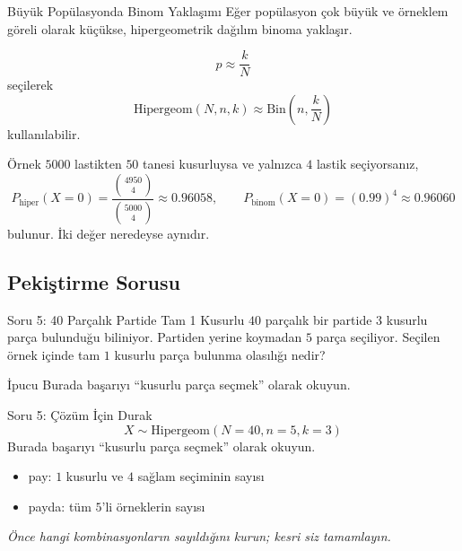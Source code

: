 \documentclass[light]{lutbeamer}
\begin{document}
\begin{frame}{Büyük Popülasyonda Binom Yaklaşımı}
    \scriptsize
    Eğer popülasyon çok büyük ve örneklem göreli olarak küçükse, hipergeometrik dağılım binoma yaklaşır.

    \[
    p \approx \frac{k}{N}
    \]
    seçilerek
    \[
    \text{Hipergeom}(N,n,k) \approx \mathrm{Bin}\left(n,\frac{k}{N}\right)
    \]
    kullanılabilir.

    \begin{exampleblock}{Örnek}
        \(5000\) lastikten \(50\) tanesi kusurluysa ve yalnızca \(4\) lastik seçiyorsanız,
        \[
        P_{\text{hiper}}(X=0)=\frac{\binom{4950}{4}}{\binom{5000}{4}}\approx 0.96058,\qquad
        P_{\text{binom}}(X=0)=(0.99)^4\approx 0.96060
        \]
        bulunur. İki değer neredeyse aynıdır.
    \end{exampleblock}
\end{frame}

\subsection{Pekiştirme Sorusu}

\begin{frame}{Soru 5: 40 Parçalık Partide Tam 1 Kusurlu}
    \small
    \(40\) parçalık bir partide \(3\) kusurlu parça bulunduğu biliniyor. Partiden yerine koymadan \(5\) parça seçiliyor. Seçilen örnek içinde tam \(1\) kusurlu parça bulunma olasılığı nedir?

    \begin{block}{İpucu}
        Burada başarıyı ``kusurlu parça seçmek'' olarak okuyun.
    \end{block}
\end{frame}

\begin{frame}{Soru 5: Çözüm İçin Durak}
    \color{red!70!black}
    \small
    \[
    X \sim \text{Hipergeom}(N=40,n=5,k=3)
    \]
    Burada başarıyı ``kusurlu parça seçmek'' olarak okuyun.
    \begin{itemize}
        \item pay: \(1\) kusurlu ve \(4\) sağlam seçiminin sayısı
        \item payda: tüm \(5\)'li örneklerin sayısı
    \end{itemize}

    \begin{center}
        \textit{Önce hangi kombinasyonların sayıldığını kurun; kesri siz tamamlayın.}
    \end{center}
\end{frame}
\end{document}
